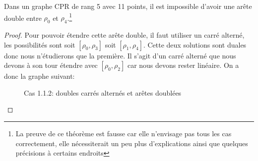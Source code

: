 \begin{lemma}
  Dans un graphe CPR de rang 5 avec 11 points, il est impossible d'avoir une arête double  entre $\rho_0$ et $\rho_4$.\footnote{La preuve de ce théorème est fausse car elle n'envisage pas tous les cas correctement, elle nécessiterait un peu plus d'explications ainsi que quelques précisions à certains endroits}
\end{lemma}

\begin{proof}
  Pour pouvoir étendre cette arête double, il faut utiliser un carré alterné, les possibilités sont soit $[\rho_0, \rho_3]$ soit $[\rho_1, \rho_4]$. Cette deux solutions sont duales donc nous n'étudierons que la première. Il s'agit d'un carré alterné que nous devons à son tour étendre avec $[\rho_0, \rho_2]$ car nous devons rester linéaire. On a donc la graphe suivant:

  \begin{figure}[H]
    \begin{center}
      \caption{Cas 1.1.2: doubles carrés alternés et arêtes doublées}
    \end{center}
  \end{figure}


\end{proof}
